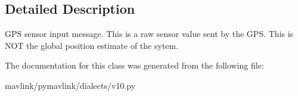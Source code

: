 \subsection{Detailed Description}
\begin{DoxyVerb}GPS sensor input message.  This is a raw sensor value sent by
the GPS. This is NOT the global position estimate of the
sytem.
\end{DoxyVerb}
 

The documentation for this class was generated from the following file\+:\begin{DoxyCompactItemize}
\item 
mavlink/pymavlink/dialects/v10.\+py\end{DoxyCompactItemize}

